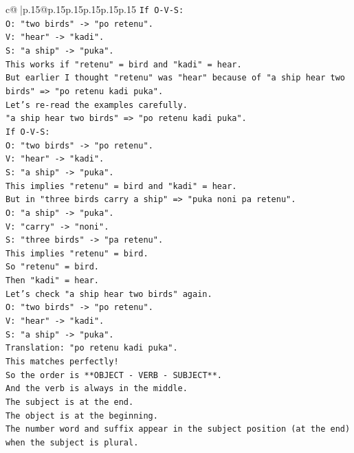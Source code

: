 \documentclass{article}
\begin{document}
{\begin{supertabular}{c@{$\;$}|p{.15\linewidth}@{}p{.15\linewidth}p{.15\linewidth}p{.15\linewidth}p{.15\linewidth}p{.15\linewidth}}
{{{\texttt{If O{-}V{-}S:} \\
\texttt{O: "two birds" {-}> "po retenu".} \\
\texttt{V: "hear" {-}> "kadi".} \\
\texttt{S: "a ship" {-}> "puka".} \\
\texttt{This works if "retenu" = bird and "kadi" = hear.} \\
\texttt{But earlier I thought "retenu" was "hear" because of "a ship hear two birds" => "po retenu kadi puka".} \\
\texttt{Let's re{-}read the examples carefully.} \\
\texttt{"a ship hear two birds" => "po retenu kadi puka".} \\
\texttt{If O{-}V{-}S:} \\
\texttt{O: "two birds" {-}> "po retenu".} \\
\texttt{V: "hear" {-}> "kadi".} \\
\texttt{S: "a ship" {-}> "puka".} \\
\texttt{This implies "retenu" = bird and "kadi" = hear.} \\
\texttt{But in "three birds carry a ship" => "puka noni pa retenu".} \\
\texttt{O: "a ship" {-}> "puka".} \\
\texttt{V: "carry" {-}> "noni".} \\
\texttt{S: "three birds" {-}> "pa retenu".} \\
\texttt{This implies "retenu" = bird.} \\
\texttt{So "retenu" = bird.} \\
\texttt{Then "kadi" = hear.} \\
\texttt{Let's check "a ship hear two birds" again.} \\
\texttt{O: "two birds" {-}> "po retenu".} \\
\texttt{V: "hear" {-}> "kadi".} \\
\texttt{S: "a ship" {-}> "puka".} \\
\texttt{Translation: "po retenu kadi puka".} \\
\texttt{This matches perfectly!} \\
\texttt{So the order is **OBJECT {-} VERB {-} SUBJECT**.} \\
\texttt{And the verb is always in the middle.} \\
\texttt{The subject is at the end.} \\
\texttt{The object is at the beginning.} \\
\texttt{The number word and suffix appear in the subject position (at the end) when the subject is plural.} \\
}}}
\end{supertabular}}
\end{document}
